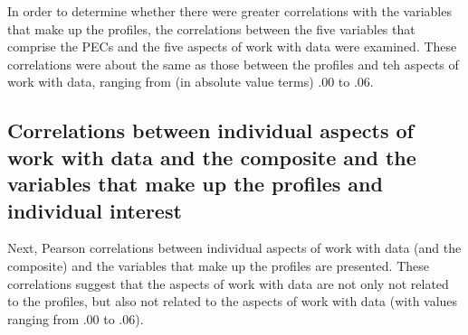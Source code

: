 \documentclass[]{book}
\theoremstyle{definition}
\theoremstyle{definition}
\theoremstyle{definition}
\theoremstyle{remark}
\begin{document}
In order to determine whether there were greater correlations with the
variables that make up the profiles, the correlations between the five
variables that comprise the PECs and the five aspects of work with data
were examined. These correlations were about the same as those between
the profiles and teh aspects of work with data, ranging from (in
absolute value terms) .00 to .06.

\subsection{Correlations between individual aspects of work with data
and the composite and the variables that make up the profiles and
individual
interest}\label{correlations-between-individual-aspects-of-work-with-data-and-the-composite-and-the-variables-that-make-up-the-profiles-and-individual-interest}

Next, Pearson correlations between individual aspects of work with data
(and the composite) and the variables that make up the profiles are
presented. These correlations suggest that the aspects of work with data
are not only not related to the profiles, but also not related to the
aspects of work with data (with values ranging from .00 to .06).
\end{document}

